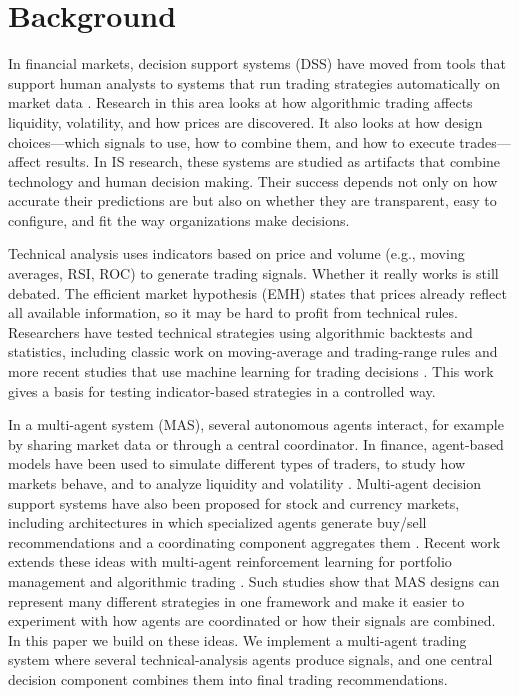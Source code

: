\documentclass{icis}
\begin{document}
\section{Background}

In financial markets, decision support systems (DSS) have moved from tools that support human analysts to systems that run trading strategies automatically on market data \autocite{hendershott_does_2011}. Research in this area looks at how algorithmic trading affects liquidity, volatility, and how prices are discovered. It also looks at how design choices—which signals to use, how to combine them, and how to execute trades—affect results. In IS research, these systems are studied as artifacts that combine technology and human decision making. Their success depends not only on how accurate their predictions are but also on whether they are transparent, easy to configure, and fit the way organizations make decisions.

Technical analysis uses indicators based on price and volume (e.g., moving averages, RSI, ROC) to generate trading signals. Whether it really works is still debated. The efficient market hypothesis (EMH) states that prices already reflect all available information, so it may be hard to profit from technical rules. Researchers have tested technical strategies using algorithmic backtests and statistics, including classic work on moving-average and trading-range rules and more recent studies that use machine learning for trading decisions \autocite{brock1992,gerlein2016,boboc2013}. This work gives a basis for testing indicator-based strategies in a controlled way.

In a multi-agent system (MAS), several autonomous agents interact, for example by sharing market data or through a central coordinator. In finance, agent-based models have been used to simulate different types of traders, to study how markets behave, and to analyze liquidity and volatility \autocite{lebaron2011,8675280}. Multi-agent decision support systems have also been proposed for stock and currency markets, including architectures in which specialized agents generate buy/sell recommendations and a coordinating component aggregates them \autocite{luo2002,korczak2013,hernes2016,hernes2024}. Recent work extends these ideas with multi-agent reinforcement learning for portfolio management and algorithmic trading \autocite{huang2022,shavandi2022}. Such studies show that MAS designs can represent many different strategies in one framework and make it easier to experiment with how agents are coordinated or how their signals are combined. In this paper we build on these ideas. We implement a multi-agent trading system where several technical-analysis agents produce signals, and one central decision component combines them into final trading recommendations.
\end{document}

